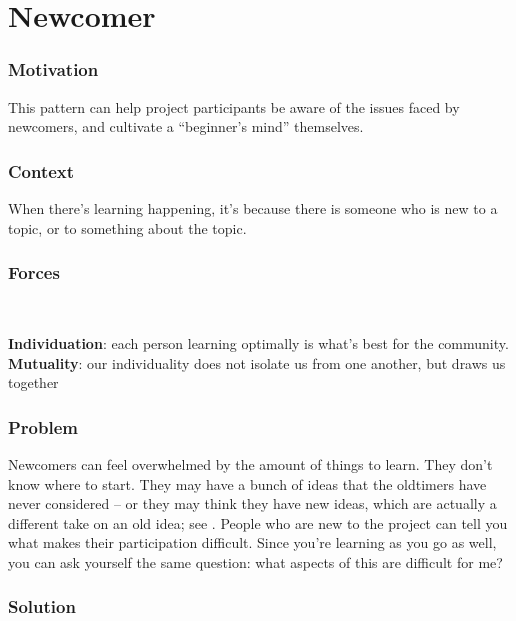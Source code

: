 

\section{Newcomer}\label{sec:Newcomer}

\subsubsection*{Motivation} This pattern can help project participants be aware of the issues faced by newcomers, and cultivate a ``beginner's mind'' themselves.

\subsubsection*{Context}
When there's learning happening, it's because there is someone who is new to a topic, or to something about the topic.

\subsubsection*{Forces}~
\parbox[t]{.85\textwidth}{
\textbf{Individuation}: each person learning optimally is what's best for the community.\\
\textbf{Mutuality}: our individuality does not isolate us from one another, but draws us together
}

\subsubsection*{Problem} Newcomers can feel overwhelmed by the amount of things to learn.  They
don't know where to start.  They may have a bunch of ideas that the
oldtimers have never considered -- or they may think they have new
ideas, which are actually a different take on an old idea; see
. People who are new to the project can tell you what makes their participation difficult.  Since you're learning as you go as well, you can ask yourself the same question: what aspects of this are difficult for me?  

\subsubsection*{Solution}

